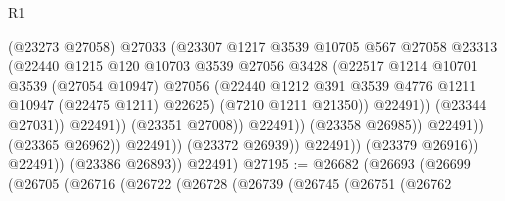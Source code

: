 \begin{lexlean}{R1}
\begin{coremodule}
                                            (@23273 @27058)
                                            @27033
                                            (@23307
                                              @1217
                                              @3539
                                              @10705
                                              @567
                                              @27058
                                              @23313
                                              (@22440
                                                @1215
                                                @120
                                                @10703
                                                @3539
                                                @27056
                                                @3428
                                                (@22517
                                                  @1214
                                                  @10701
                                                  @3539
                                                  (@27054 @10947)
                                                  @27056
                                                  (@22440
                                                    @1212
                                                    @391
                                                    @3539
                                                    @4776
                                                    @1211
                                                    @10947
                                                    (@22475 @1211)
                                                    @22625)
                                                  (@7210 @1211 @21350))
                                                @22491))
                                            (@23344 @27031))
                                          @22491))
                                      (@23351 @27008))
                                    @22491))
                                (@23358 @26985))
                              @22491))
                          (@23365 @26962))
                        @22491))
                    (@23372 @26939))
                  @22491))
              (@23379 @26916))
            @22491))
        (@23386 @26893))
      @22491)
@27195 := @26682
    (@26693
      (@26699
        (@26705
          (@26716
            (@26722
              (@26728
                (@26739
                  (@26745
                    (@26751
                      (@26762

\end{coremodule}
\end{lexlean}
